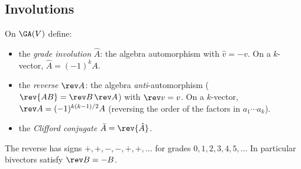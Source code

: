 \subsection{Involutions}

\begin{definition}
On $\GA(V)$ define:
\begin{itemize}
  \item the \emph{grade involution} $\hat A$: the algebra automorphism with $\hat v=-v$. On a $k$-vector, $\hat A=(-1)^kA$.
  \item the \emph{reverse} $\rev A$: the algebra \emph{anti}-automorphism ($\rev{AB}=\rev B\,\rev A$) with $\rev v=v$. On a $k$-vector, $\rev A=(-1)^{k(k-1)/2}A$ (reversing the order of the factors in $a_1\cdots a_k$).
  \item the \emph{Clifford conjugate} $\bar A=\rev{\hat A}$.
\end{itemize}
\end{definition}

The reverse has signs $+,+,-,-,+,+,\dots$ for grades $0,1,2,3,4,5,\dots$ In particular bivectors satisfy $\rev B=-B$.
